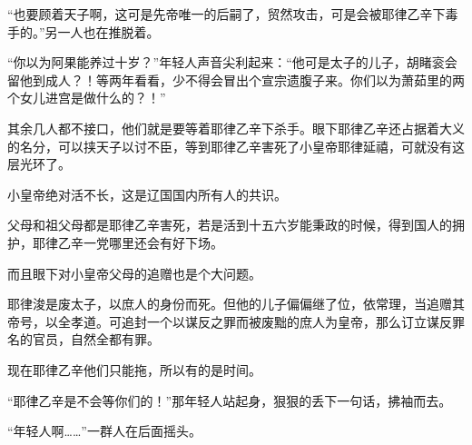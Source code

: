 “也要顾着天子啊，这可是先帝唯一的后嗣了，贸然攻击，可是会被耶律乙辛下毒手的。”另一人也在推脱着。

“你以为阿果能养过十岁？”年轻人声音尖利起来：“他可是太子的儿子，胡睹衮会留他到成人？！等两年看看，少不得会冒出个宣宗遗腹子来。你们以为萧茹里的两个女儿进宫是做什么的？！”

其余几人都不接口，他们就是要等着耶律乙辛下杀手。眼下耶律乙辛还占据着大义的名分，可以挟天子以讨不臣，等到耶律乙辛害死了小皇帝耶律延禧，可就没有这层光环了。

小皇帝绝对活不长，这是辽国国内所有人的共识。

父母和祖父母都是耶律乙辛害死，若是活到十五六岁能秉政的时候，得到国人的拥护，耶律乙辛一党哪里还会有好下场。

而且眼下对小皇帝父母的追赠也是个大问题。

耶律浚是废太子，以庶人的身份而死。但他的儿子偏偏继了位，依常理，当追赠其帝号，以全孝道。可追封一个以谋反之罪而被废黜的庶人为皇帝，那么订立谋反罪名的官员，自然全都有罪。

现在耶律乙辛他们只能拖，所以有的是时间。

“耶律乙辛是不会等你们的！”那年轻人站起身，狠狠的丢下一句话，拂袖而去。

“年轻人啊……”一群人在后面摇头。

